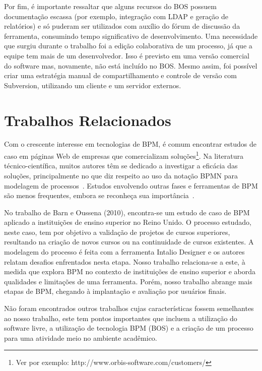 \documentclass[12pt]{article}
\begin{document}
Por fim, é importante ressaltar que alguns recursos do BOS possuem documentação escassa (por exemplo, integração com LDAP e geração de relatórios) e só puderam ser utilizados com auxílio do fórum de discussão da ferramenta, consumindo tempo significativo de desenvolvimento. Uma necessidade que surgiu durante o trabalho foi a edição colaborativa de um processo, já que a equipe tem mais de um desenvolvedor. Isso é previsto em uma versão comercial do software mas, novamente, não está incluído no BOS. Mesmo assim, foi possível criar uma estratégia manual de compartilhamento e controle de versão com Subversion, utilizando um cliente e um servidor externos.

\section{Trabalhos Relacionados}

Com o crescente interesse em tecnologias de BPM, é comum encontrar estudos de caso em páginas Web de empresas que comercializam soluções\footnote{Ver por exemplo: http://www.orbis-software.com/customers/}. Na literatura técnico-científica, muitos autores têm se dedicado a investigar a eficácia das soluções, principalmente no que diz respeito ao uso da notação BPMN para modelagem de processos~\cite{recker2006, muehlen2008, ostroski-sbsi2012}. Estudos envolvendo outras fases e ferramentas de BPM são menos frequentes, embora se reconheça sua importância~\cite{SORDI2007, wohed2009patterns}.

No trabalho de Barn e Oussena (2010), encontra-se um estudo de caso de BPM aplicado a instituições de ensino superior no Reino Unido. O processo estudado, neste caso, tem por objetivo a validação de projetos de cursos superiores, resultando na criação de novos cursos ou na continuidade de cursos existentes. A modelagem do processo é feita com a ferramenta Intalio Designer e os autores relatam desafios enfrentados nesta etapa. Nosso trabalho relaciona-se a este, à medida que explora BPM no contexto de instituições de ensino superior e aborda qualidades e limitações de uma ferramenta. Porém, nosso trabalho abrange mais etapas de BPM, chegando à implantação e avaliação por usuários finais.

Não foram encontrados outros trabalhos cujas características fossem semelhantes ao nosso trabalho, este tem pontos importantes que incluem a utilização do software livre, a utilização de tecnologia BPM (BOS) e a criação de um processo para uma atividade meio no ambiente acadêmico.
\end{document}
